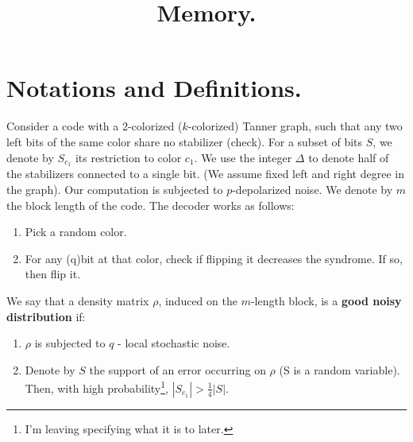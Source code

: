 \documentclass[manuscript,screen,review]{acmart}
\begin{document}

\title{ Memory. }
\maketitle

\newcommand*{\Mbas}{\mathcal{X}^\prime}
\newcommand*{\bas}{\mathcal{X}}
\newcommand*{\sMbas}{\Mbas}
\newcommand*{\QQ}{C_{X}/C_{Z}^\perp }
\newcommand*{\trig}{ Triorthogonal }
\newcommand*{\Hyp}{ Hyperproduct }
\newcommand*{\Cin}{ C_{\text{initial}} }
\newcommand*{\Ctan}{ C_{\text{Tan}} }



\newcommand*{\QACze}{\mathbf{QAC}_{0}}
\newcommand*{\QNCzef}{\mathbf{QNC}_{0,f}}
\newcommand*{\QNCze}{\mathbf{QNC}_{0}}
\newcommand*{\QNCon}{\mathbf{QNC}_{1}}
\newcommand*{\NCon}{\mathbf{NC}_{1}}
\newcommand*{\noiseQNCon}{noisy-$\QNCon$}
\newcommand*{\QNC}{\mathbf{QNC}}
\newcommand*{\QNCG}{\mathbf{QNC_G}}
\newcommand*{\NC}{\mathbf{NC}}
\newcommand*{\QNCiG}{\mathbf{QNC_{G,i}}}


\newcommand*{\CDO} {CDFT} 


\section{Notations and Definitions.} Consider a code with a 2-colorized ($k$-colorized) Tanner graph, such that any two left bits of the same color share no stabilizer (check). For a subset of bits $S$, we denote by $S_{c_1}$ its restriction to color $c_1$. We use the integer $\Delta$ to denote half of the stabilizers connected to a single bit. (We assume fixed left and right degree in the graph). Our computation is subjected to $p$-depolarized noise. We denote by $m$ the block length of the code. The decoder works as follows:
\begin{enumerate}
  \item Pick a random color.
  \item For any (q)bit at that color, check if flipping it decreases the syndrome. If so, then flip it.
\end{enumerate}
We say that a density matrix $\rho$, induced on the $m$-length block, is a \textbf{good noisy distribution} if:
\begin{enumerate}
  \item $\rho$ is subjected to $q$ - local stochastic noise. 
  \item Denote by $S$ the support of an error occurring on $\rho$ (S is a random variable). Then, with high probability\footnote{I'm leaving specifying what it is to later.}, $|S_{c_{1}}| > \frac{1}{4} |S|$. 
\end{enumerate}
\end{document}
